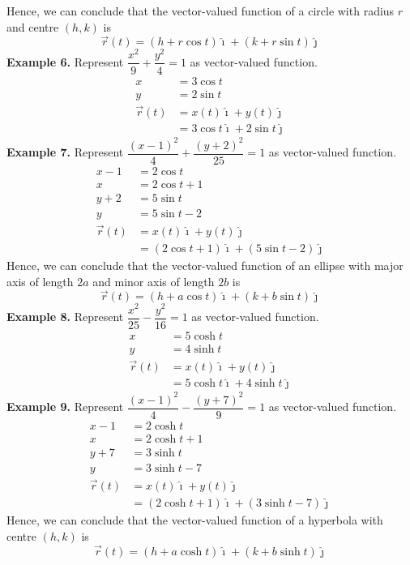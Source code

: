 Hence, we can conclude that the vector-valued function of a circle with radius $r$ and centre $(h, k)$ is \[\vec{r}(t) = (h + r\cos{t})\hat{\imath} + (k + r\sin{t})\hat{\jmath}\]
\noindent\textbf{Example 6. } Represent $\dfrac{x^2}{9}+ \dfrac{y^2}{4} = 1$ as vector-valued function.
\begin{align*}
    x          & = 3\cos{t}                                    \\
    y          & = 2\sin{t}                                    \\
    \vec{r}(t) & = x(t)\hat{\imath} + y(t)\hat{\jmath}         \\
               & = 3\cos{t}\hat{\imath} + 2\sin{t}\hat{\jmath}
\end{align*}
\noindent\textbf{Example 7. } Represent $\dfrac{(x-1)^2}{4}+ \dfrac{(y+2)^2}{25} = 1$ as vector-valued function.
\begin{align*}
    x - 1      & = 2\cos{t}                                                \\
    x          & = 2\cos{t} + 1                                            \\
    y + 2      & = 5\sin{t}                                                \\
    y          & = 5\sin{t} - 2                                            \\
    \vec{r}(t) & = x(t)\hat{\imath} + y(t)\hat{\jmath}                     \\
               & = (2\cos{t} + 1)\hat{\imath} + (5\sin{t} - 2)\hat{\jmath}
\end{align*}
Hence, we can conclude that the vector-valued function of an ellipse with major axis of length $2a$ and minor axis of length $2b$ is \[\vec{r}(t) = (h + a\cos{t})\hat{\imath} + (k + b\sin{t})\hat{\jmath}\]
\noindent\textbf{Example 8. } Represent $\dfrac{x^2}{25} - \dfrac{y^2}{16} = 1$ as vector-valued function.
\begin{align*}
    x          & = 5\cosh{t}                                     \\
    y          & = 4\sinh{t}                                     \\
    \vec{r}(t) & = x(t)\hat{\imath} + y(t)\hat{\jmath}           \\
               & = 5\cosh{t}\hat{\imath} + 4\sinh{t}\hat{\jmath}
\end{align*}
\noindent\textbf{Example 9. } Represent $\dfrac{(x-1)^2}{4} - \dfrac{(y+7)^2}{9} = 1$ as vector-valued function.
\begin{align*}
    x - 1      & = 2\cosh{t}                                                 \\
    x          & = 2\cosh{t} + 1                                             \\
    y + 7      & = 3\sinh{t}                                                 \\
    y          & = 3\sinh{t} - 7                                             \\
    \vec{r}(t) & = x(t)\hat{\imath} + y(t)\hat{\jmath}                       \\
               & = (2\cosh{t} + 1)\hat{\imath} + (3\sinh{t} - 7)\hat{\jmath}
\end{align*}
Hence, we can conclude that the vector-valued function of a hyperbola with centre $(h, k)$ is \[\vec{r}(t) = (h + a\cosh{t})\hat{\imath} + (k + b\sinh{t})\hat{\jmath}\]
